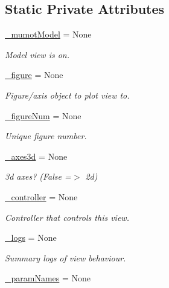 \subsection*{Static Private Attributes}
\begin{DoxyCompactItemize}
\item 
\hyperlink{class_mu_mo_t_1_1_mu_mo_t_1_1_mu_mo_tview_aeacd9541246371f0db5cc3e3779762fa}{\+\_\+mumot\+Model} = None
\begin{DoxyCompactList}\small\item\em Model view is on. \end{DoxyCompactList}\item 
\hyperlink{class_mu_mo_t_1_1_mu_mo_t_1_1_mu_mo_tview_abf6d9f6be3898e307415d4598cde264d}{\+\_\+figure} = None
\begin{DoxyCompactList}\small\item\em Figure/axis object to plot view to. \end{DoxyCompactList}\item 
\hyperlink{class_mu_mo_t_1_1_mu_mo_t_1_1_mu_mo_tview_a5748371a5f2e09033908d21bb12f94c0}{\+\_\+figure\+Num} = None
\begin{DoxyCompactList}\small\item\em Unique figure number. \end{DoxyCompactList}\item 
\hyperlink{class_mu_mo_t_1_1_mu_mo_t_1_1_mu_mo_tview_a506ccaeadc9c6f4102cf4e06f5a6be2a}{\+\_\+axes3d} = None
\begin{DoxyCompactList}\small\item\em 3d axes? (False =$>$ 2d) \end{DoxyCompactList}\item 
\hyperlink{class_mu_mo_t_1_1_mu_mo_t_1_1_mu_mo_tview_a15f56ca9811d1e67d721fa64f9b0dc1e}{\+\_\+controller} = None
\begin{DoxyCompactList}\small\item\em Controller that controls this view. \end{DoxyCompactList}\item 
\hyperlink{class_mu_mo_t_1_1_mu_mo_t_1_1_mu_mo_tview_ac0ad5d0ca27f2668c0676334ee73ff52}{\+\_\+logs} = None
\begin{DoxyCompactList}\small\item\em Summary logs of view behaviour. \end{DoxyCompactList}\item 
\hyperlink{class_mu_mo_t_1_1_mu_mo_t_1_1_mu_mo_tview_ac7734326ac8dbbf9bd0d2c9838633195}{\+\_\+param\+Names} = None

\end{DoxyCompactItemize}

